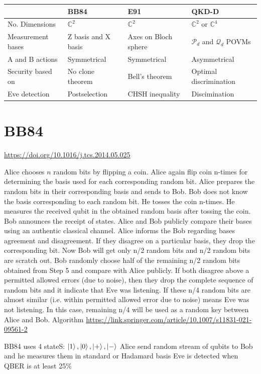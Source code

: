\documentclass[12pt,a4paper]{article}
\begin{document}
\begin{table}[h!]
  \centering
  \begin{tabular}{|l|l|l|l|}
    \hline
     &BB84 & E91 &  QKD-D \\
    \hline
    No. Dimensions & $\mathbb{C}^2$ & $\mathbb{C}^2$ & $\mathbb{C}^2$ or $\mathbb{C}^4$ \\
    \hline
    Measurement bases &	Z basis and X basis&  Axes on Bloch sphere &  $\mathcal{P}_d$ and  $\mathcal{Q}_d$ POVMs \\
    \hline
    A and B actions & Symmetrical &  Symmetrical &  Asymmetrical \\
    \hline
        Security based on &	No clone theorem&  Bell's theorem &  Optimal discrimination \\
    \hline
    Eve detection&	Postselection& CHSH inequality &  Discimination \\
    \hline
  \end{tabular}
\end{table}

\section{BB84}
\url{https://doi.org/10.1016/j.tcs.2014.05.025}
\begin{algorithm}
\caption{BB84 protocol}
\begin{algorithmic}[1]
\State Alice chooses $n$ random bits by flipping a coin.
\State Alice again flip coin n-times for determining the basis used for each corresponding random bit.
\State Alice prepares the random bits in their corresponding basis and sends to Bob.
\State Bob does not know the basis corresponding to each random bit. He tosses the coin n-times. He measures the received qubit in the obtained random basis after tossing the coin. Bob announces the receipt of states.
\State Alice and Bob publicly compare their bases using an authentic classical channel. Alice informs the Bob regarding bases agreement and disagreement. If they disagree on a particular basis, they drop the corresponding bit. Now Bob will get only n/2 random bits and n/2 random bits are scratch out.
\State Bob randomly choose half of the remaining n/2 random bits
obtained from Step 5 and compare with Alice publicly. If both disagree above a permitted allowed errors (due to noise), then they drop the complete sequence of random bits and it indicate that Eve was listening. If these n/4 random bits are almost similar (i.e. within permitted allowed error due to noise) means Eve was not listening. In this case, remaining n/4 will be used as a random key between Alice and Bob.
\State Algorithm \url{https://link.springer.com/article/10.1007/s11831-021-09561-2}
\end{algorithmic}
\end{algorithm}
BB84 uses 4 stateS:
$\ket{1}, \ket{0}, \ket{+}, \ket{-}$
Alice send random stream of qubits to Bob and he measures them in standard or Hadamard basis
Eve is detected when QBER is at least 25\%
\end{document}

